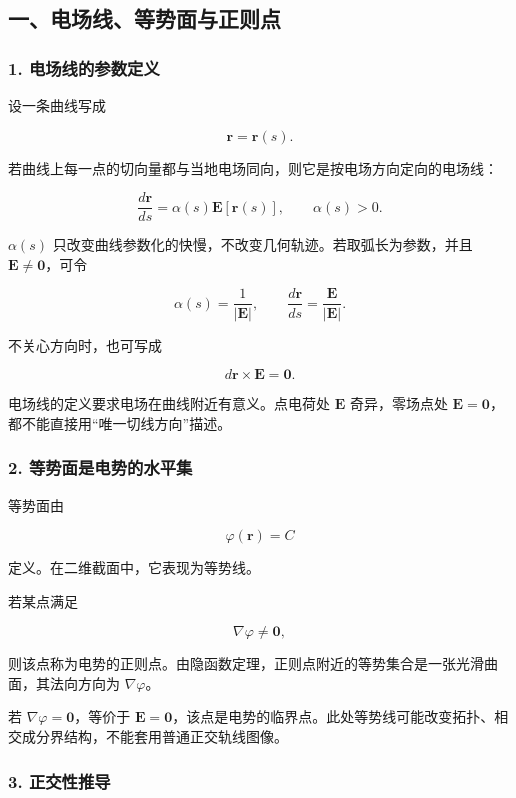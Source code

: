 \subsection{一、电场线、等势面与正则点}\label{m2:ux4e00ux7535ux573aux7ebfux7b49ux52bfux9762ux4e0eux6b63ux5219ux70b9}

\subsubsection{1.
电场线的参数定义}\label{m2:ux7535ux573aux7ebfux7684ux53c2ux6570ux5b9aux4e49}

设一条曲线写成

\[
\mathbf r=\mathbf r(s).
\]

若曲线上每一点的切向量都与当地电场同向，则它是按电场方向定向的电场线：

\[
\boxed{
\frac{d\mathbf r}{ds}
=
\alpha(s)\mathbf E[\mathbf r(s)],
\qquad
\alpha(s)>0
}.
\]

\(\alpha(s)\)
只改变曲线参数化的快慢，不改变几何轨迹。若取弧长为参数，并且
\(\mathbf E\neq\mathbf0\)，可令

\[
\alpha(s)=\frac{1}{|\mathbf E|},
\qquad
\frac{d\mathbf r}{ds}
=
\frac{\mathbf E}{|\mathbf E|}.
\]

不关心方向时，也可写成

\[
d\mathbf r\times\mathbf E=\mathbf0.
\]

电场线的定义要求电场在曲线附近有意义。点电荷处 \(\mathbf E\)
奇异，零场点处
\(\mathbf E=\mathbf0\)，都不能直接用``唯一切线方向''描述。

\subsubsection{2.
等势面是电势的水平集}\label{m2:ux7b49ux52bfux9762ux662fux7535ux52bfux7684ux6c34ux5e73ux96c6}

等势面由

\[
\boxed{\varphi(\mathbf r)=C}
\]

定义。在二维截面中，它表现为等势线。

若某点满足

\[
\nabla\varphi\neq\mathbf0,
\]

则该点称为电势的正则点。由隐函数定理，正则点附近的等势集合是一张光滑曲面，其法向方向为
\(\nabla\varphi\)。

若 \(\nabla\varphi=\mathbf0\)，等价于
\(\mathbf E=\mathbf0\)，该点是电势的临界点。此处等势线可能改变拓扑、相交成分界结构，不能套用普通正交轨线图像。

\subsubsection{3. 正交性推导}\label{m2:ux6b63ux4ea4ux6027ux63a8ux5bfc}

